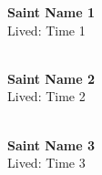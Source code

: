 \documentclass{article}
\newcommand{\saintentry}[3]{%
  \noindent
  \begin{minipage}{0.2\textwidth}
  \end{minipage}%
  \begin{minipage}{0.8\textwidth}
    \textbf{#2}\\
    Lived: #3\\
    \lipsum[1][1-2]\\ %
  \end{minipage}%
  \par\vspace{1em}
}
\begin{document}
\saintentry{image1}{Saint Name 1}{Time 1}
\saintentry{image2}{Saint Name 2}{Time 2}
\saintentry{image3}{Saint Name 3}{Time 3}
\end{document}
